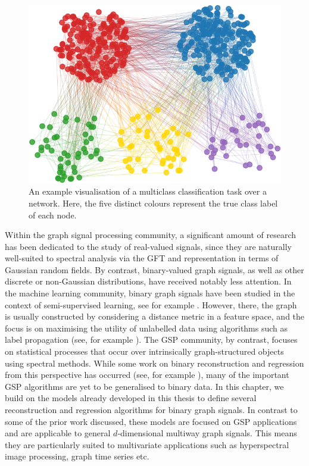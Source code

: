 \begin{figure}[t] 
    \begin{center}
        \includegraphics[width=0.7\linewidth]{Figures/multiclass_graph.pdf}
    \end{center}
   \caption[Visualisation of a multiclass classification task over a network]{An example visualisation of a multiclass classification task over a network. Here, the five distinct colours represent the true class label of each node. } 
    \label{fig:mutliclass_graph}
\end{figure} 

Within the graph signal processing community, a significant amount of research has been dedicated to the study of real-valued signals, since they are naturally well-suited to spectral analysis via the GFT and representation in terms of Gaussian random fields. By contrast, binary-valued graph signals, as well as other discrete or non-Gaussian distributions, have received notably less attention. In the machine learning community, binary graph signals have been studied in the context of semi-supervised learning, see for example \cite{Kondor2002,Zhu2003}. However, there, the graph is usually constructed by considering a distance metric in a feature space, and the focus is on maximising the utility of unlabelled data using algorithms such as label propagation (see, for example \cite{Zhang2017}). The GSP community, by contrast, focuses on statistical processes that occur over intrinsically graph-structured objects using spectral methods. While some work on binary reconstruction and regression from this perspective has occurred (see, for example \cite{Tran2020}), many of the important GSP algorithms are yet to be generalised to binary data. In this chapter, we build on the models already developed in this thesis to define several reconstruction and regression algorithms for binary graph signals. In contrast to some of the prior work discussed, these models are focused on GSP applications and are applicable to general $d$-dimensional multiway graph signals. This means they are particularly suited to multivariate applications such as hyperspectral image processing, graph time series etc.  

